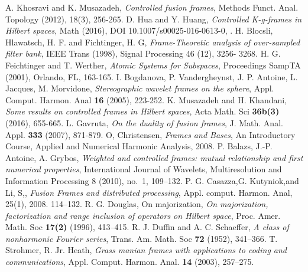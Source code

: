 \documentclass{mfatshort}
\begin{document}
\begin{thebibliography}{1}

{A. Khosravi and K. Musazadeh},	%
\textit{Controlled fusion frames},	%
{Methods Funct. Anal. Topology}	%
\textbf{}	%
{(2012)},	%
{18(3)},	%
{256-265}.	%
{D. Hua and Y. Huang},	%
\textit{Controlled K-g-frames in Hilbert spaces},	%
{ Math}	%
\textbf{}	%
{(2016)},	%
{DOI 10.1007/s00025-016-0613-0},	%
{}.	%
{ H. Blocsli, Hlawatsch, H. F. and Fichtinger, H. G},	%
\textit{Frame-Theoretic analysis of over-sampled filter bank},	%
{IEEE Trans}	%
\textbf{}	%
{(1998)},	%
{Signal Processing 46 (12)},	%
{3256- 3268}.	%
{H. G. Feichtinger and T. Werther},	%
\textit{Atomic Systems for Subspaces},	%
{Proceedings SampTA}	%
\textbf{}	%
{(2001)},	%
{Orlando, FL},	%
{163-165}.	%
{I. Bogdanova, P. Vandergheynst, J. P. Antoine, L. Jacques, M. Morvidone},	%
\textit{Stereographic wavelet frames on the sphere},	%
{Appl. Comput. Harmon. Anal}	%
\textbf{16}	%
{(2005)},	%
{223-252}.	%
{ K. Musazadeh and H. Khandani},	%
\textit{Some results on controlled frames in Hilbert spaces},	%
{ Acta Math. Sci}	%
\textbf{36b(3)}	%
{(2016)},	%
{655-665}.	%
{L. Gavruta},	%
\textit{On the duality of fusion frames},	%
{J. Math. Anal. Appl.}	%
\textbf{333}	%
{(2007)},	%
{871-879}.	%
{O, Christensen},	%
\textit{Frames and Bases},	%
{ An Introductory Course},	%
{Applied and Numerical Harmonic Analysis},	%
{2008}.		%
{P. Balazs, J.-P. Antoine, A. Grybos},	%
\textit{Weighted and controlled frames: mutual relationship and first numerical properties},	%
{International Journal of Wavelets, Multiresolution and Information Processing 8 }	%
\textbf{}	%
{(2010)},	%
{no.~1},	%
{109--132}.	%
{P. G. Casazza,G. Kutyniok,and Li, S,},	%
\textit{Fusion Frames and distributed processing},	%
{Appl. comput. Harmon. Anal},	%
{25(1)},	%
{2008}.		%
{114--132}.	%
{R. G. Douglas, On majorization},	%
\textit{On majorization, factorization and range inclusion of operators on Hilbert space},	%
{Proc. Amer. Math. Soc}	%
\textbf{17(2)}	%
{(1996)},	%
{413--415}.	%
{R. J. Duffin and A. C. Schaeffer},	%
\textit{A class of nonharmonic Fourier series},	%
{Trans. Am. Math. Soc}	%
\textbf{72}	%
{(1952)},	%
{341--366}.	%
{T. Strohmer, R. Jr. Heath},	%
\textit{Grass manian frames with applications to coding and communications},	%
{ Appl. Comput. Harmon. Anal.}	%
\textbf{14}	%
{(2003)},	%
{257--275}.	%
\end{thebibliography}
\end{document}
